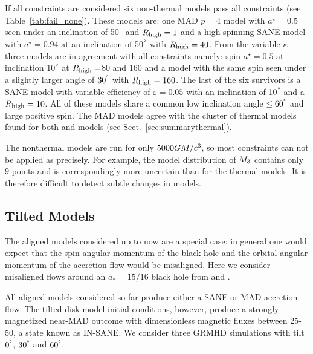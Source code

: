 

If all constraints are considered six non-thermal models pass all constraints (see Table~\ref{tab:fail_none}).
These models are: one \hamr MAD $p=4$ model with $a^\star=0.5$ seen under an inclination of 50$^\degree$ and  $R_{\rm high}=1$ and a high spinning SANE model with $a^\star=0.94$ at an inclination of 50$^\degree$ with $R_{\rm high}=40$.
From the \bhac variable $\kappa$ three models are in agreement with all constraints namely: spin $a^\star=0.5$ at inclination 10$^\degree$ at $R_{\rm high}=$80 and 160 and a model with the same spin seen under a slightly larger angle of $30^\degree$ with $R_{\rm high}=160$.
The last of the six survivors is a \bhac SANE model with variable efficiency of  $\varepsilon=0.05$ with an inclination of 10$^\degree$ and a $R_{\rm high}=10$.
All of these models share a common low inclination angle $\leq 60^\degree$ and large positive spin.
The MAD models agree with the cluster of thermal models found for both \bhac and \kharma models (see Sect.~\ref{sec:summarythermal}).



The nonthermal models are run for only $5000GM/c^3$, so most  constraints can not be applied as precisely.
For example, the model distribution of $M_{3}$ contains only $9$ points and is correspondingly more uncertain than for the thermal models.
It is therefore difficult to detect subtle changes in models.

\subsection{Tilted Models}

The aligned models considered up to now are a special case: in general one would expect that the spin angular momentum of the black hole and the orbital angular momentum of the accretion flow would be misaligned.
Here we consider misaligned flows around an $a_*=15/16$ black hole from \citet{Liska2018} and \citet{Chatterjee2020}.

All aligned models considered so far produce either a SANE or MAD accretion flow.
The tilted disk model initial conditions, however, produce a strongly magnetized near-MAD outcome with dimensionless magnetic fluxes between 25-50, a state known as IN-SANE.
We consider three GRMHD simulations with tilt $0^{\degree}$, $30^{\degree}$ and $60^{\degree}$.

